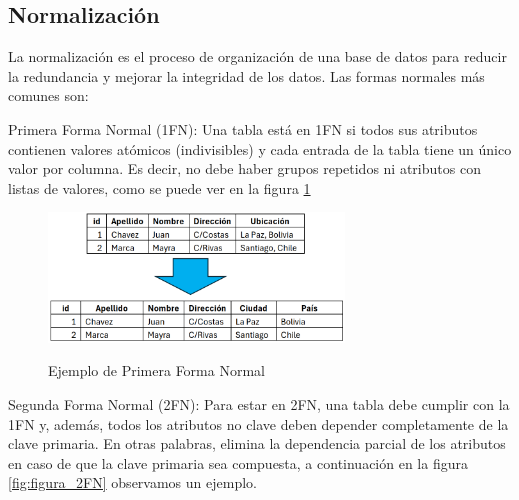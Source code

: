 	\subsection{Normalización}
		La normalización es el proceso de organización de una base de datos para reducir la redundancia y mejorar la integridad de los datos. Las formas normales más comunes son:
		
		Primera Forma Normal (1FN): Una tabla está en 1FN si todos sus atributos contienen valores atómicos (indivisibles) y cada entrada de la tabla tiene un único valor por columna. Es decir, no debe haber grupos repetidos ni atributos con listas de valores, como se puede ver en la figura \ref{fig:figura_1FN}
		
		\vspace{0.3cm} %
		
		\begin{figure}[h] %
			\caption[Ejemplo 1FN]
			{\newline Ejemplo de Primera Forma Normal} %
			\vspace{-0.2cm}
			\centering
			\includegraphics[width=0.7\textwidth]{imagenes/normalizacion/1FN.png} %
			\vspace{0.3cm}
			\vspace{-0.6cm}
			\label{fig:figura_1FN} %
		\end{figure}
		
		Segunda Forma Normal (2FN): Para estar en 2FN, una tabla debe cumplir con la 1FN y, además, todos los atributos no clave deben depender completamente de la clave primaria. En otras palabras, elimina la dependencia parcial de los atributos en caso de que la clave primaria sea compuesta, a continuación en la figura \ref{fig:figura_2FN} observamos un ejemplo.
		
		\vspace{0.3cm} %
		
